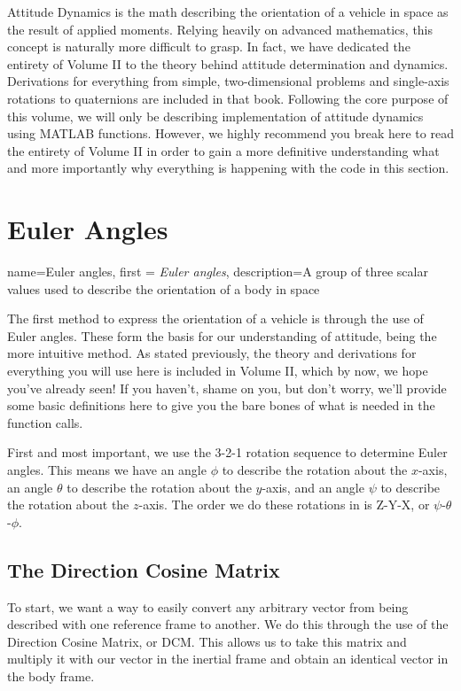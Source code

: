 \documentclass[12pt]{report}
\begin{document}
Attitude Dynamics is the math describing the orientation of a vehicle in space as the result of applied moments. Relying heavily on advanced mathematics, this concept is naturally more difficult to grasp. In fact, we have dedicated the entirety of Volume II to the theory behind attitude determination and dynamics. Derivations for everything from simple, two-dimensional problems and single-axis rotations to quaternions are included in that book. Following the core purpose of this volume, we will only be describing implementation of attitude dynamics using MATLAB functions. However, we highly recommend you break here to read the entirety of Volume II in order to gain a more definitive understanding what and more importantly why everything is happening with the code in this section.


\section{Euler Angles}\label{sec:Euler Angles}
{
    name=Euler angles,
    first = {\textit{Euler angles}},
    description={A group of three scalar values used to describe the orientation of a body in space}
}

The first method to express the orientation of a vehicle is through the use of Euler angles. These form the basis for our understanding of attitude, being the more intuitive method. As stated previously, the theory and derivations for everything you will use here is included in Volume II, which by now, we hope you've already seen! If you haven't, shame on you, but don't worry, we'll provide some basic definitions here to give you the bare bones of what is needed in the function calls.

First and most important, we use the 3-2-1 rotation sequence to determine Euler angles. This means we have an angle $\phi$ to describe the rotation about the $x$-axis, an angle $\theta$ to describe the rotation about the $y$-axis, and an angle $\psi$ to describe the rotation about the $z$-axis. The order we do these rotations in is Z-Y-X, or $\psi$-$\theta$-$\phi$. 

\subsection{The Direction Cosine Matrix}\label{sec:TheDCM}

To start, we want a way to easily convert any arbitrary vector from being described with one reference frame to another. We do this through the use of the Direction Cosine Matrix, or DCM. This allows us to take this matrix and multiply it with our vector in the inertial frame and obtain an identical vector in the body frame.
\end{document}
